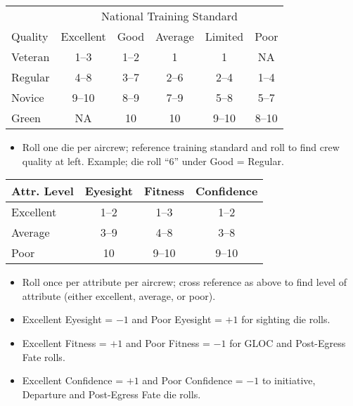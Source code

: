 \begin{onecolumntable}
\small
\begin{tabularx}{\linewidth}{l*{5}{c}}
\toprule
&\multicolumn{5}{c}{National Training Standard}\\
\cmidrule(){2-6}
Quality&Excellent&Good&Average&Limited&Poor\\
\midrule
Veteran&1--3&1--2&1&1&NA\\
Regular&4--8&3--7&2--6&2--4&1--4\\
Novice&9--10&8--9&7--9&5--8&5--7\\
Green&NA&10&10&9--10&8--10\\
\bottomrule
\end{tabularx}
\begin{tablenote}{\linewidth}
\begin{itemize}[nosep]
    \item Roll one die per aircrew; reference training standard and roll to find crew quality at left. Example; die roll “6” under Good = Regular.
\end{itemize}
\end{tablenote}

\vspace{\floatsep}

\small
\begin{tabularx}{\linewidth}{lCCC}
\toprule
Attr. Level&Eyesight&Fitness&Confidence\\
\midrule
Excellent&1--2&1--3&1--2\\
Average&3--9&4--8&3--8\\
Poor&10&9--10&9--10\\
\bottomrule
\end{tabularx}
\begin{tablenote}{\linewidth}
\begin{itemize}[nosep]
    \item Roll once per attribute per aircrew; cross reference as above to find level of attribute (either excellent, average, or poor).
    \item Excellent Eyesight = $-1$ and Poor Eyesight = $+1$ for sighting die rolls.
    \item Excellent Fitness = $+1$ and Poor Fitness = $-1$ for GLOC and Post-Egress Fate rolls.
    \item Excellent Confidence = $+1$ and Poor Confidence = $-1$ to initiative, Departure and Post-Egress Fate die rolls.
\end{itemize}
\end{tablenote}


\end{onecolumntable}
